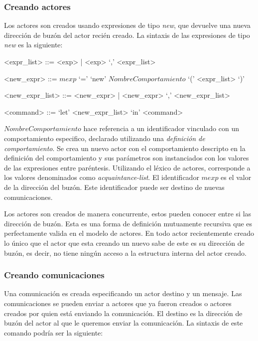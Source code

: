 \subsubsection*{Creando actores}
Los actores son creados usando expresiones de tipo \textit{new}, que devuelve una nueva dirección de buzón del actor recién creado. La sintaxis de las expresiones de tipo \textit{new} es la siguiente:

\begin{grammar}
  <expr_list> ::= <exp> | <exp> `,' <expr_list>  
  
  <new_expr> ::= $mexp$ `=' `new' $NombreComportamiento$ `(' <expr_list> `)'
  
  <new_expr_list> ::= <new_expr> | <new_expr> `,' <new_expr_list>
  
  <command> ::=  `let' <new_expr_list> `in' <command> 
\end{grammar}

$NombreComportamiento$ hace referencia a un identificador vinculado con un comportamiento especifico, declarado utilizando una \textit{definición de comportamiento}. Se crea un nuevo actor con el comportamiento descripto en la definición del comportamiento y sus parámetros son instanciados con los valores de las expresiones entre paréntesis. Utilizando el léxico de actores, corresponde a los valores denominados como \textit{acquaintance-list}. El identificador $mexp$ es el valor de la dirección del buzón. Este identificador puede ser destino de nuevas comunicaciones. 

Los actores son creados de manera concurrente, estos pueden conocer entre si las dirección de buzón. Esta es una forma de definición mutuamente recursiva que es perfectamente valida en el modelo de actores. En todo actor recientemente creado lo único que el actor que esta creando un nuevo sabe de este es su dirección de buzón, es decir, no tiene ningún acceso a la estructura interna del actor creado.

\subsubsection*{Creando comunicaciones}
Una comunicación es creada especificando un actor destino y un mensaje. Las comunicaciones se pueden enviar a actores que ya fueron creados o actores creados por quien está enviando la comunicación. El destino es la dirección de buzón del actor al que le queremos enviar la comunicación. La sintaxis de este comando podría ser la siguiente:

